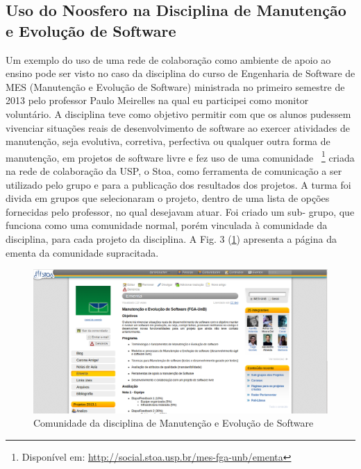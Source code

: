 
\subsection{Uso do Noosfero na Disciplina de Manutenção e Evolução de Software}
\label{mes-unb}

Um exemplo do uso de uma rede de colaboração como ambiente de apoio ao ensino
pode ser visto no caso da disciplina do curso de Engenharia de Software de MES
(Manutenção e Evolução de Software) ministrada no primeiro semestre de 2013 pelo
professor Paulo Meirelles na qual eu participei como monitor voluntário. 
A disciplina teve como objetivo permitir com que os
alunos pudessem vivenciar situações reais de desenvolvimento de software ao
exercer atividades de manutenção, seja evolutiva, corretiva, perfectiva ou
qualquer outra forma de manutenção, em projetos de software livre e fez uso de
uma comunidade
~\footnote{Disponível em: \url{http://social.stoa.usp.br/mes-fga-unb/ementa}}
criada na rede de colaboração da USP, o Stoa, como ferramenta de comunicação a ser
utilizado pelo grupo e para a publicação dos resultados dos projetos.
%
A turma foi divida em grupos que selecionaram o projeto, dentro de uma lista
de opções fornecidas pelo professor, no qual desejavam atuar. Foi criado um sub-
grupo, que funciona como uma comunidade normal, porém vinculada à comunidade
da disciplina, para cada projeto da disciplina. A Fig. 3 (\ref{mes-unb})
apresenta a página da ementa da comunidade supracitada. 

\begin{figure}[h]
	\centering
	\label{mes-unb}
		\includegraphics[keepaspectratio=true,scale=0.3]
		{figuras/mes-unb.eps}
	\caption{Comunidade da disciplina de Manutenção e Evolução de Software}
\end{figure}

